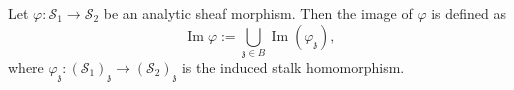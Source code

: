 Let $\varphi: \mathcal{S}_1 \rightarrow \mathcal{S}_2$ be an analytic sheaf morphism. Then the image of $\varphi$ is defined as
$$
\operatorname{Im} \varphi := \bigcup_{\mathfrak{z} \in B} \operatorname{Im}(\varphi_{\mathfrak{z}}),
$$
where $\varphi_{\mathfrak{z}}: (\mathcal{S}_1)_{\mathfrak{z}} \rightarrow (\mathcal{S}_2)_{\mathfrak{z}}$ is the induced stalk homomorphism.
